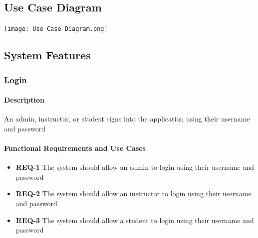 \documentclass{article}
\begin{document}
\newpage

\subsection{Use Case Diagram}

\texttt{[image: Use Case Diagram.png]}

\newpage

\subsection{System Features}

\subsubsection{Login}

\paragraph{Description} An admin, instructor, or student signs into the application using their username and password

\paragraph{Functional Requirements and Use Cases}

\begin{itemize}
  \item \textbf{REQ-1} The system should allow an admin to login using their username and password
  \item \textbf{REQ-2} The system should allow an instructor to login using their username and password
  \item \textbf{REQ-3} The system should allow a student to login using their username and password
\end{itemize}


\vspace{0.1in}
\end{document}
